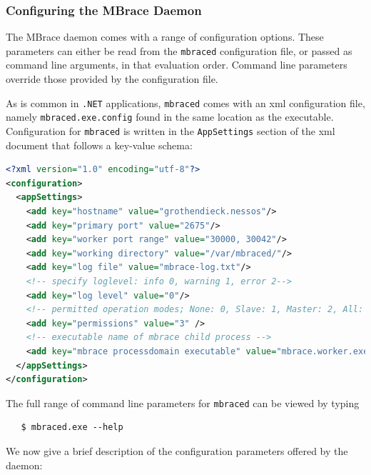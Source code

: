 \documentclass[9pt,a4paper]{article}
\newcommand{\mbrace}{MBrace}
\newcommand{\TitularMbrace}{MBrace}
\newcommand{\dotnet}{\texttt{\hbox{.}NET}}
\begin{document}
\subsubsection*{Configuring the \TitularMbrace{} Daemon}

The \mbrace{} daemon comes with a range of configuration options.
These parameters can either be read from the \texttt{mbraced} configuration file, 
or passed as command line arguments, in that evaluation order.
Command line parameters override those provided by the configuration file.

As is common in \dotnet{} applications, \texttt{mbraced} comes with an xml
configuration file, namely \texttt{mbraced.exe.config} found in the same location 
as the executable. Configuration for \texttt{mbraced} is written in the 
\texttt{AppSettings} section of the xml document that follows a key-value 
schema:
\begin{lstlisting}[language=Xml]
<?xml version="1.0" encoding="utf-8"?>
<configuration>
  <appSettings>
    <add key="hostname" value="grothendieck.nessos"/>
    <add key="primary port" value="2675"/>
    <add key="worker port range" value="30000, 30042"/>
    <add key="working directory" value="/var/mbraced/"/>
    <add key="log file" value="mbrace-log.txt"/>
    <!-- specify loglevel: info 0, warning 1, error 2-->
    <add key="log level" value="0"/>
    <!-- permitted operation modes; None: 0, Slave: 1, Master: 2, All: 3 -->
    <add key="permissions" value="3" />
    <!-- executable name of mbrace child process -->
    <add key="mbrace processdomain executable" value="mbrace.worker.exe"/>
  </appSettings>
</configuration>
\end{lstlisting}
The full range of command line parameters for \texttt{mbraced} can be viewed by typing
\begin{verbatim}
   $ mbraced.exe --help
\end{verbatim}
%
We now give a brief description of the configuration parameters offered by the daemon:
\end{document}
